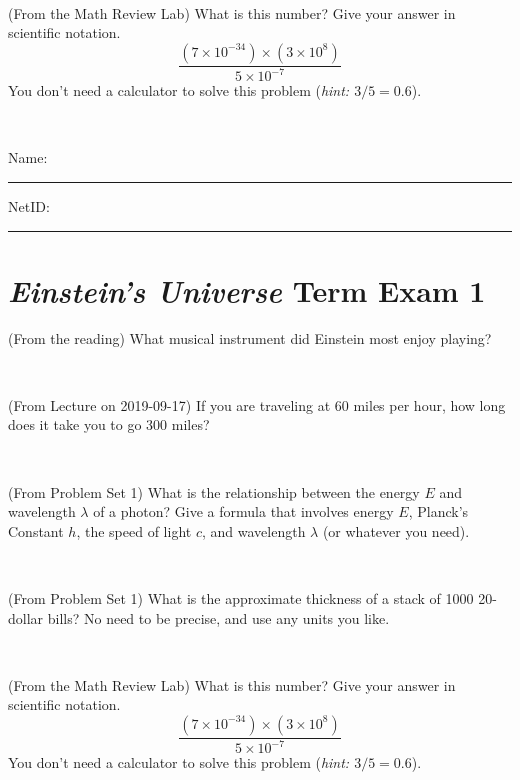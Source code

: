 \documentclass[12pt, letterpaper]{article}
\begin{document}
\vfill ~

\begin{problem} (From the Math Review Lab)
What is this number? Give your answer in scientific notation.
$$
\frac{(7\times10^{-34})\times(3\times10^8)}{5\times10^{-7}}
$$
You don't need a calculator to solve this problem (\textit{hint: $3/5=0.6$}).
\end{problem}


\vfill ~


\cleardoublepage



\noindent
Name: \rule[-1ex]{0.60\textwidth}{0.1pt}
NetID: \rule[-1ex]{0.20\textwidth}{0.1pt}

\section*{\textsl{Einstein's Universe} Term Exam 1}
\setcounter{problem}{1}


\begin{problem} (From the reading)
What musical instrument did Einstein most enjoy playing?
\end{problem}


\vfill ~

\begin{problem} (From Lecture on 2019-09-17)
If you are traveling at 60 miles per hour, how long does
it take you to go 300 miles?
\end{problem}


\vfill ~

\begin{problem} (From Problem Set 1)
What is the relationship between the energy $E$ and wavelength
$\lambda$ of a photon? Give a formula that involves energy $E$,
Planck's Constant $h$, the speed of light $c$, and wavelength
$\lambda$ (or whatever you need).
\end{problem}

\vfill ~

\begin{problem} (From Problem Set 1)
What is the approximate thickness of a stack of 1000 20-dollar bills?
No need to be precise, and use any units you like.
\end{problem}


\vfill ~


\clearpage


\begin{problem} (From the Math Review Lab)
What is this number? Give your answer in scientific notation.
$$
\frac{(7\times10^{-34})\times(3\times10^8)}{5\times10^{-7}}
$$
You don't need a calculator to solve this problem (\textit{hint: $3/5=0.6$}).
\end{problem}
\end{document}
